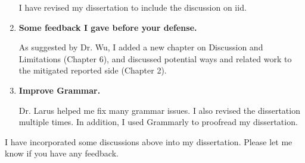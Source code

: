 \documentclass{article}
\begin{document}
\begin{enumerate}
I have revised my dissertation to include the discussion on iid.


\item \textbf{Some feedback I gave before your defense.}

As suggested by Dr. Wu, I added a new chapter on Discussion and Limitations (Chapter 6), and discussed potential ways and related work to the mitigated reported side (Chapter 2).

\item \textbf{Improve Grammar.}

Dr. Larus helped me fix many grammar issues. I also revised the dissertation multiple times. In addition, I used Grammarly to proofread my dissertation.


\end{enumerate}

I have incorporated some discussions above into my dissertation. Please let me know if you have any feedback.
\end{document}
